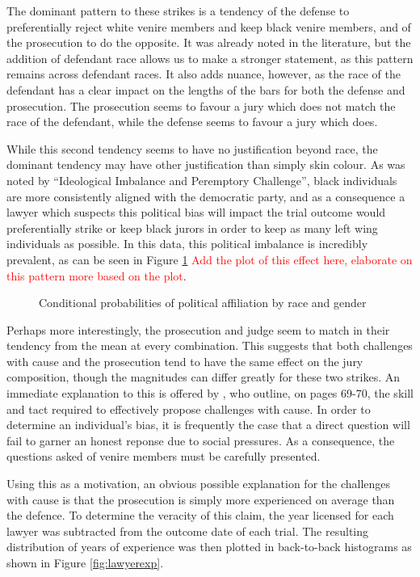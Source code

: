 The dominant pattern to these strikes is a tendency of the defense to preferentially reject white venire members and keep black
venire members, and of the prosecution to do the opposite. It was already noted in the literature\cite{JurySunshineProj}, but the
addition of defendant race allows us to make a stronger statement, as this pattern remains across defendant races. It also adds
nuance, however, as the race of the defendant has a clear impact on the lengths of the bars for both the defense and
prosecution. The prosecution seems to favour a jury which does not match the race of the defendant, while the defense seems to
favour a jury which does.

While this second tendency seems to have no justification beyond race, the dominant tendency may have other justification than
simply skin colour. As was noted by ``Ideological Imbalance and Peremptory Challenge'', black individuals are more consistently
aligned with the democratic party, and as a consequence a lawyer which suspects this political bias will impact the trial outcome
would preferentially strike or keep black jurors in order to keep as many left wing individuals as possible. In this data, this
political imbalance is incredibly prevalent, as can be seen in Figure \ref{fig:racepolitics} \textcolor{red}{Add the plot of this
  effect here, elaborate on this pattern more based on the plot}.

\begin{figure}[h!]
  \caption[Political Affiliation by Race and Gender (Sunshine)]
  {Conditional probabilities of political affiliation by race and gender} 
  \label{fig:racepolitics}
\end{figure}

Perhaps more interestingly, the prosecution and judge seem to match in their tendency from the mean at every combination. This
suggests that both challenges with cause and the prosecution tend to have the same effect on the jury composition, though the
magnitudes can differ greatly for these two strikes. An immediate explanation to this is offered by \cite{hansvidjudging}, who
outline, on pages 69-70, the skill and tact required to effectively propose challenges with cause. In order to determine an
individual's bias, it is frequently the case that a direct question will fail to garner an honest reponse due to social pressures.
As a consequence, the questions asked of venire members must be carefully presented.

Using this as a motivation, an obvious possible explanation for the challenges with cause is that the prosecution is simply more
experienced on average than the defence. To determine the veracity of this claim, the year licensed for each lawyer was
subtracted from the outcome date of each trial. The resulting distribution of years of experience was then plotted in back-to-back
histograms as shown in Figure \ref{fig:lawyerexp}.

